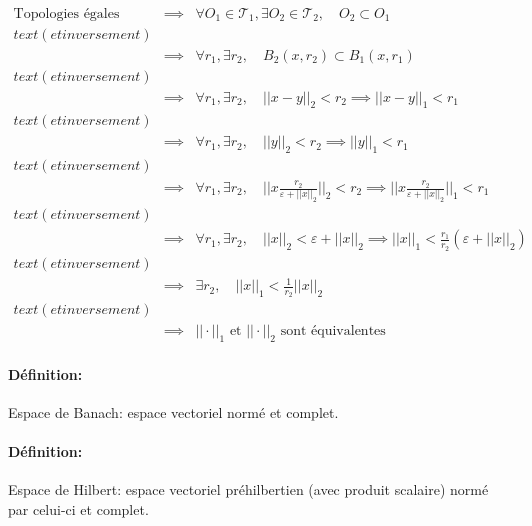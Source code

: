 \documentclass[a4paper, 11pt, french]{book}
\theoremstyle{plain} %
\theoremstyle{definition} %
\theoremstyle{remark} %
\newcommand{\1}{\mathds{1}}
\begin{document}
{\fbox{$\Longleftarrow$}
$
	\begin{array}{rcl}
		\text{Topologies égales}
		  & \implies & \forall O_1\in\mathscr{T}_1, \exists O_2\in\mathscr{T}_2, \quad O_2\subset O_1                                                \\text{(et inversement)}\\
		  & \implies & \forall r_1, \exists r_2, \quad B_2(x, r_2)\subset B_1(x, r_1)                                                                \\text{(et inversement)}\\
		  & \implies & \forall r_1, \exists r_2, \quad ||x-y||_2<r_2\implies ||x-y||_1<r_1                                                           \\text{(et inversement)}\\
		  & \implies & \forall r_1, \exists r_2, \quad ||y||_2<r_2\implies ||y||_1<r_1                                                               \\text{(et inversement)}\\
		  & \implies & \forall r_1, \exists r_2, \quad ||x\frac{r_2}{\varepsilon+||x||_2}||_2<r_2\implies ||x\frac{r_2}{\varepsilon+||x||_2}||_1<r_1 \\text{(et inversement)}\\
		  & \implies & \forall r_1, \exists r_2, \quad ||x||_2<\varepsilon+||x||_2\implies ||x||_1<\frac{r_1}{r_2}(\varepsilon+||x||_2)              \\text{(et inversement)}\\
		  & \implies & \exists r_2, \quad ||x||_1 <\frac{1}{r_2}||x||_2                                                                              \\text{(et inversement)}\\
		  & \implies & \text{$|| \cdot||_1$ et $|| \cdot||_2$ sont équivalentes}
	\end{array}
$

\paragraph{Définition:} Espace de Banach: espace vectoriel normé et complet.
\paragraph{Définition:} Espace de Hilbert: espace vectoriel préhilbertien (avec produit scalaire) normé par celui-ci et complet.

}
\end{document}
